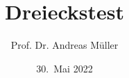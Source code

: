%
%
%


\beamertemplatenavigationsymbolsempty
\title[Dreieckstest]{Dreieckstest}
\author[A.~Müller]{Prof. Dr. Andreas Müller}
\date[]{30.~Mai 2022}

